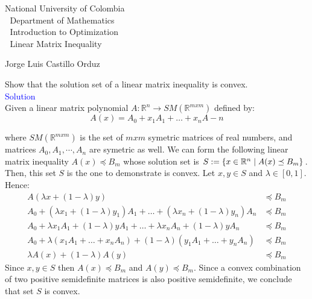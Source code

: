 \documentclass[12pt, oneside]{article}%
\def\R{{\mathbb R}}
\begin{document}
\setlength{\parindent}{0cm}%
\hoffset-0.46cm
\voffset-1.46cm

\begin{window}
\Large  \hspace{0.6cm}\textsf{National University of Colombia} \\
\textcolor{white}{\tiny.}  \Large \hspace{0.6cm} \textsf{Department of Mathematics} \\
\textcolor{white}{\tiny.}   \large\hspace{5.5cm}\textsf{Introduction to Optimization}\\
\textcolor{white}{\tiny.}   \large \hspace{6.05cm}\textsf{Linear Matrix Inequality} 
\end{window}


\vspace{0.5cm}
\normalfont
\textsf{Jorge Luis Castillo Orduz} 
\normalsize
\dotfill
\vspace{1cm}

Show that the solution set of a linear matrix inequality is convex.\\

\Large\textsf{\textcolor{blue}{Solution}}
\normalsize\\

Given a linear matrix polynomial $A:\R^n \rightarrow SM(\R^{mxm})$ defined by:
$$A(x)=A_0+x_1A_1+ \dots + x_n A-n $$

where $SM(\R^{mxm})$ is the set of $mxm$ symetric matrices of real numbers, and matrices $A_0,A_1,\cdots ,A_n$ are symetric as well. We can form the following linear matrix inequality $A(x)	\preceq B_m$
whose solution set is $S:=\{x\in \R^n\hspace{0.1cm} | \hspace{0.1cm}A(x)\preceq B_m \}$. Then, this set $S$ is the one to demonstrate is convex. Let $x,y\in S$ and $\lambda\in [0,1]$. Hence:
\begin{align*}
    A(\lambda x +(1-\lambda)y) &\preceq B_m\\
    A_0+(\lambda x_1 +(1-\lambda)y_1)A_1+ \dots + (\lambda x_n +(1-\lambda)y_n) A_n&\preceq B_m \\
    A_0+\lambda x_1A_1 +(1-\lambda)yA_1+ \dots + \lambda x_n A_n +(1-\lambda)yA_n&\preceq B_m \\
    A_0+\lambda(x_1A_1+\dots + x_n A_n) +(1-\lambda)(y_1A_1+ \dots +y_nA_n)&\preceq B_m \\
    \lambda A(x) +(1-\lambda)A(y) &\preceq B_m
\end{align*}
Since $x,y\in S$ then $A(x)\preceq B_m$ and $A(y)\preceq B_m$. Since a convex combination of two positive semidefinite matrices is also positive semidefinite, we conclude that set $S$ is convex.
\end{document}
